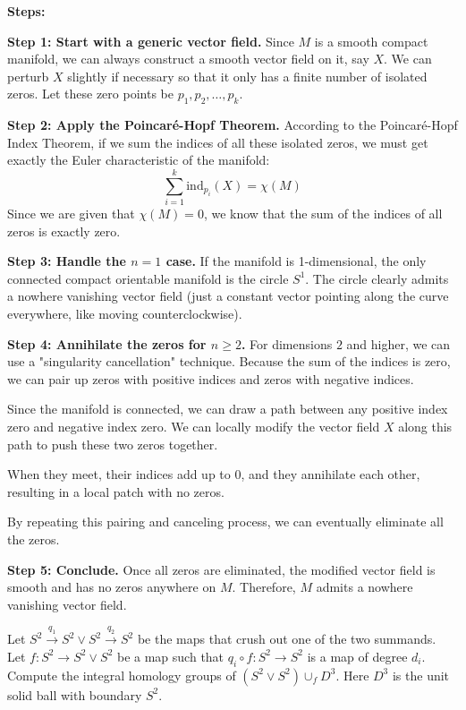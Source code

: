 \begin{solution}
\textbf{Steps:}

\textbf{Step 1: Start with a generic vector field.}
Since $M$ is a smooth compact manifold, we can always construct a smooth vector field on it, say $X$. We can perturb $X$ slightly if necessary so that it only has a finite number of isolated zeros. Let these zero points be $p_1, p_2, \dots, p_k$.

\textbf{Step 2: Apply the Poincaré-Hopf Theorem.}
According to the Poincaré-Hopf Index Theorem, if we sum the indices of all these isolated zeros, we must get exactly the Euler characteristic of the manifold:
\[ \sum_{i=1}^{k} \mathrm{ind}_{p_i}(X) = \chi(M) \]
Since we are given that $\chi(M) = 0$, we know that the sum of the indices of all zeros is exactly zero.

\textbf{Step 3: Handle the $n=1$ case.}
If the manifold is 1-dimensional, the only connected compact orientable manifold is the circle $S^1$. The circle clearly admits a nowhere vanishing vector field (just a constant vector pointing along the curve everywhere, like moving counterclockwise).

\textbf{Step 4: Annihilate the zeros for $n \ge 2$.}
For dimensions $2$ and higher, we can use a "singularity cancellation" technique. Because the sum of the indices is zero, we can pair up zeros with positive indices and zeros with negative indices.

Since the manifold is connected, we can draw a path between any positive index zero and negative index zero. We can locally modify the vector field $X$ along this path to push these two zeros together.

When they meet, their indices add up to $0$, and they annihilate each other, resulting in a local patch with no zeros.

By repeating this pairing and canceling process, we can eventually eliminate all the zeros.

\textbf{Step 5: Conclude.}
Once all zeros are eliminated, the modified vector field is smooth and has no zeros anywhere on $M$. Therefore, $M$ admits a nowhere vanishing vector field.
\end{solution}

\begin{exercise}
\label{geometry:2017:2}
Let $S^{2} \xrightarrow{q_{1}} S^{2} \vee S^{2} \xrightarrow{q_{2}} S^{2}$ be the maps that crush out one of the two summands. Let $f : S^{2} \to S^{2} \vee S^{2}$ be a map such that $q_{i} \circ f : S^{2} \to S^{2}$ is a map of degree $d_{i}$. Compute the integral homology groups of $(S^{2} \vee S^{2}) \cup_{f} D^{3}$. Here $D^{3}$ is the unit solid ball with boundary $S^{2}$.
\end{exercise}

